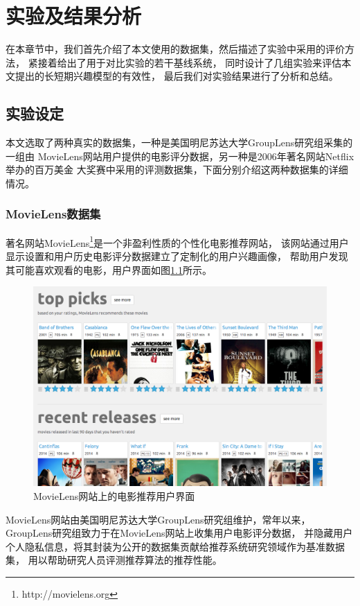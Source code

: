 \chapter{实验及结果分析}
在本章节中，我们首先介绍了本文使用的数据集，然后描述了实验中采用的评价方法，
紧接着给出了用于对比实验的若干基线系统，
同时设计了几组实验来评估本文提出的长短期兴趣模型的有效性，
最后我们对实验结果进行了分析和总结。

\section{实验设定}
本文选取了两种真实的数据集，一种是美国明尼苏达大学GroupLens研究组采集的一组由
MovieLens网站用户提供的电影评分数据，另一种是2006年著名网站Netflix举办的百万美金
大奖赛中采用的评测数据集，下面分别介绍这两种数据集的详细情况。

\subsection{MovieLens数据集}
著名网站MovieLens\footnote{http://movielens.org}是一个非盈利性质的个性化电影推荐网站，
该网站通过用户显示设置和用户历史电影评分数据建立了定制化的用户兴趣画像，
帮助用户发现其可能喜欢观看的电影，用户界面如图\ref{fig:movielens}所示。

\begin{figure}[htbp]
\centering
\includegraphics[scale=0.36]{images/movielens.png}
\caption{MovieLens网站上的电影推荐用户界面}
\label{fig:movielens}
\end{figure}

MovieLens网站由美国明尼苏达大学GroupLens研究组维护，常年以来，
GroupLens研究组致力于在MovieLens网站上收集用户电影评分数据，
并隐藏用户个人隐私信息，将其封装为公开的数据集贡献给推荐系统研究领域作为基准数据集，
用以帮助研究人员评测推荐算法的推荐性能。

